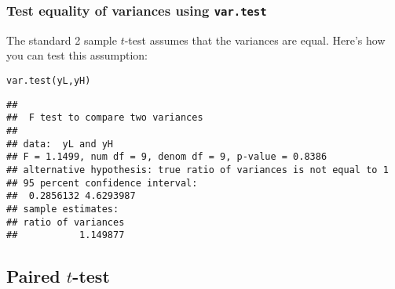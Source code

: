 \documentclass[color=usenames,dvipsnames]{beamer}\usepackage[]{graphicx}\usepackage[]{color}
\makeatletter
\newcommand{\hlstd}[1]{\textcolor[rgb]{0,0,0}{#1}}%
\newcommand{\hlkwd}[1]{\textcolor[rgb]{0.004,0.004,0.506}{#1}}%
\newenvironment{kframe}{%
 \def\at@end@of@kframe{}%
 \ifinner\ifhmode%
  \def\at@end@of@kframe{\end{minipage}}%
  \begin{minipage}{\columnwidth}%
 \fi\fi%
 \def\FrameCommand##1{\hskip\@totalleftmargin \hskip-\fboxsep
 \colorbox{shadecolor}{##1}\hskip-\fboxsep
     \hskip-\linewidth \hskip-\@totalleftmargin \hskip\columnwidth}%
 \MakeFramed {\advance\hsize-\width
   \@totalleftmargin\z@ \linewidth\hsize
   \@setminipage}}%
 {\par\unskip\endMakeFramed%
 \at@end@of@kframe}
\newenvironment{knitrout}{}{} %
\makeatother
\begin{document}
\begin{frame}[fragile]
  \frametitle{Test equality of variances using {\tt var.test}
  }
  The standard 2 sample $t$-test assumes that the variances are
  equal. Here's how you can test this assumption:
\begin{knitrout}\small
{}\color{fgcolor}\begin{kframe}
\begin{alltt}
\hlkwd{var.test}\hlstd{(yL, yH)}
\end{alltt}
\begin{verbatim}
## 
## 	F test to compare two variances
## 
## data:  yL and yH
## F = 1.1499, num df = 9, denom df = 9, p-value = 0.8386
## alternative hypothesis: true ratio of variances is not equal to 1
## 95 percent confidence interval:
##  0.2856132 4.6293987
## sample estimates:
## ratio of variances 
##           1.149877
\end{verbatim}
\end{kframe}
\end{knitrout}
\end{frame}


\begin{comment}
\begin{frame}
  \frametitle{$F$-distribution}

\end{frame}
\end{comment}



\subsection{Paired $t$-test}
\end{document}
